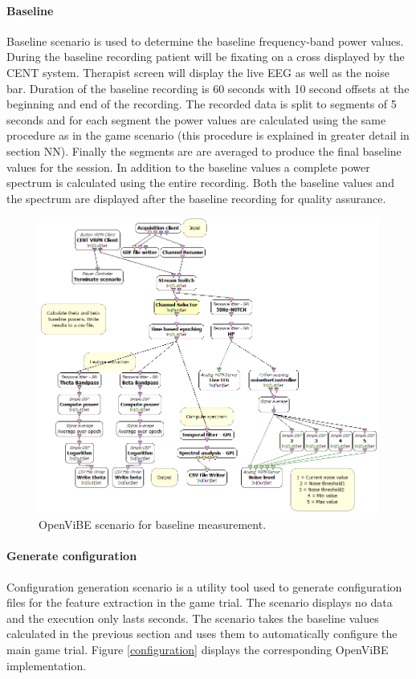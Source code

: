 \paragraph{Baseline}
Baseline scenario is used to determine the baseline frequency-band power values. During the baseline recording patient will be fixating on a cross displayed by the CENT system. Therapist screen will display the live EEG as well as the noise bar. Duration of the baseline recording is 60 seconds with 10 second offsets at the beginning and end of the recording. The recorded data is split to segments of 5 seconds and for each segment the power values are calculated using the same procedure as in the game scenario (this procedure is explained in greater detail in section NN). Finally the segments are are averaged to produce the final baseline values for the session. In addition to the baseline values a complete power spectrum is calculated using the entire recording. Both the baseline values and the spectrum are displayed after the baseline recording for quality assurance.

\begin{figure}[h]
	\centering
	\includegraphics[scale=0.3]{baseline.png}
	\caption{OpenViBE scenario for baseline measurement.}
\end{figure}  

\paragraph{Generate configuration}
Configuration generation scenario is a utility tool used to generate configuration files for the feature extraction in the game trial. The scenario displays no data and the execution only lasts seconds. The scenario takes the baseline values calculated in the previous section and uses them to automatically configure the main game trial. Figure \ref{configuration} displays the corresponding OpenViBE implementation.

